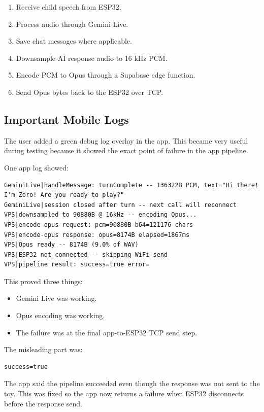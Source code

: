 \documentclass[11pt,a4paper]{article}
\begin{document}
\begin{enumerate}[leftmargin=*]
  \item Receive child speech from ESP32.
  \item Process audio through Gemini Live.
  \item Save chat messages where applicable.
  \item Downsample AI response audio to 16 kHz PCM.
  \item Encode PCM to Opus through a Supabase edge function.
  \item Send Opus bytes back to the ESP32 over TCP.
\end{enumerate}

\subsection{Important Mobile Logs}

The user added a green debug log overlay in the app. This became very useful during testing because it showed the exact point of failure in the app pipeline.

One app log showed:

\begin{lstlisting}[style=logstyle]
GeminiLive|handleMessage: turnComplete -- 136322B PCM, text="Hi there! I'm Zoro! Are you ready to play?"
GeminiLive|session closed after turn -- next call will reconnect
VPS|downsampled to 90880B @ 16kHz -- encoding Opus...
VPS|encode-opus request: pcm=90880B b64=121176 chars
VPS|encode-opus response: opus=8174B elapsed=1867ms
VPS|Opus ready -- 8174B (9.0% of WAV)
VPS|ESP32 not connected -- skipping WiFi send
VPS|pipeline result: success=true error=
\end{lstlisting}

This proved three things:

\begin{itemize}[leftmargin=*]
  \item Gemini Live was working.
  \item Opus encoding was working.
  \item The failure was at the final app-to-ESP32 TCP send step.
\end{itemize}

The misleading part was:

\begin{lstlisting}[style=logstyle]
success=true
\end{lstlisting}

The app said the pipeline succeeded even though the response was not sent to the toy. This was fixed so the app now returns a failure when ESP32 disconnects before the response send.
\end{document}
